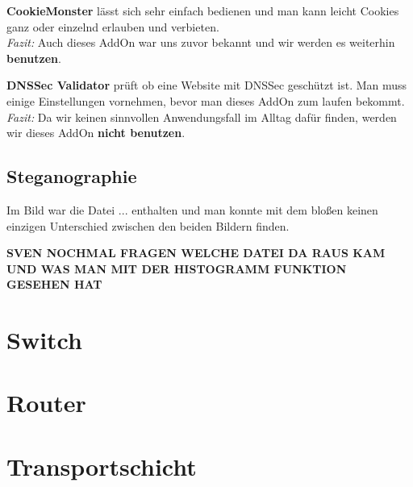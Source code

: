 \documentclass{scrartcl}
\begin{document}
  \textbf{CookieMonster} lässt sich sehr einfach bedienen und man kann leicht Cookies ganz oder einzelnd erlauben und verbieten.\\
  \emph{Fazit:} Auch dieses AddOn war uns zuvor bekannt und wir werden es weiterhin \textbf{benutzen}.
  
  \textbf{DNSSec Validator} prüft ob eine Website mit DNSSec geschützt ist. Man muss einige Einstellungen vornehmen, bevor man dieses AddOn zum laufen bekommt.\\
  \emph{Fazit:} Da wir keinen sinnvollen Anwendungsfall im Alltag dafür finden, werden wir dieses AddOn \textbf{nicht benutzen}.
  
  
  \subsection[Aufgabe 12 Steganographie]{Steganographie}
  
  Im Bild war die Datei ... enthalten und man konnte mit dem bloßen keinen einzigen Unterschied zwischen den beiden Bildern finden.
  
  \textbf{SVEN NOCHMAL FRAGEN WELCHE DATEI DA RAUS KAM UND WAS MAN MIT DER HISTOGRAMM FUNKTION GESEHEN HAT}
       
  \newpage
\section[Versuch 4 Switch]{Switch}



  \newpage
\section[Versuch 5 Router]{Router}



  \newpage
\section[Versuch 6 Transportschicht]{Transportschicht}
  
\end{document}

